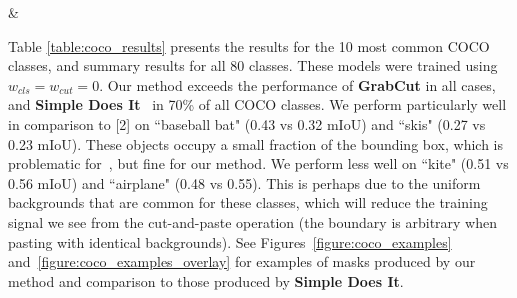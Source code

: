 \documentclass[runningheads]{llncs}
\begin{document}
   &  \\ \hline%

Table \ref{table:coco_results} presents the results for the 10 most common COCO classes, and summary results for all 80 classes. These models were trained using $w_{cls}=w_{cut}=0$.
Our method exceeds the performance of {\bf GrabCut} in all cases, and {\bf Simple Does It}~\cite{khoreva2016simple} in 70\% of all COCO classes.
We perform particularly well in comparison to [2] on ``baseball bat" (0.43 vs 0.32 mIoU) and ``skis" (0.27 vs 0.23 mIoU). These objects occupy a small fraction of the bounding box, which is problematic for~\cite{khoreva2016simple}, but fine for our method. We perform less well on ``kite" (0.51 vs 0.56 mIoU) and ``airplane" (0.48 vs 0.55). This is perhaps due to the uniform backgrounds that are common for these classes, which will reduce the training signal we see from the cut-and-paste operation (the boundary is arbitrary when pasting with identical backgrounds).
See Figures~\ref{figure:coco_examples} and~\ref{figure:coco_examples_overlay} for examples of masks produced by our method and comparison to those produced by {\bf Simple Does It}.
\end{document}

